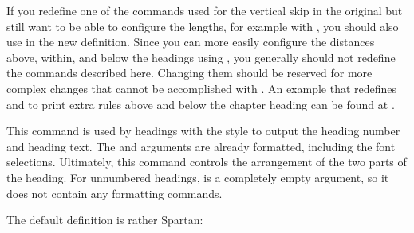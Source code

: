 If you redefine one of the commands used for the vertical skip in the original
 but still want to be able to configure the lengths, for
example with , you should also
use  in the new definition.
Since you can more easily configure the distances above, within,
and below the headings using ,
you generally should not redefine the commands described here. Changing them
should be reserved for more complex changes that cannot be accomplished with
. An
example that redefines  and
 to print extra rules above and below the chapter
heading can be found at \cite{wiki-en}.%
%
\EndIndexGroup


\begin{Declaration}
\end{Declaration}
This command is used by headings with the  style to
output the heading number and heading text. The  and
 arguments are already formatted, including the font
selections. Ultimately, this command controls the arrangement of the two parts
of the heading. For unnumbered headings,  is a completely empty
argument, so it does not contain any formatting commands.

The default definition is rather Spartan:
\begin{lstcode}
  \newcommand{\partlineswithprefixformat}[3]{%
    #2#3%
  }
\end{lstcode}

